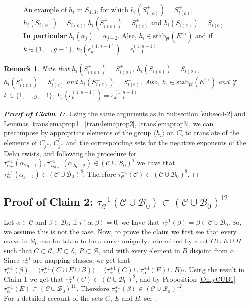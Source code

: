 \documentclass[twoside,11pt,a4paper]{article}
\newtheorem{Rem}[Def]{Remark}
\newcommand*{\stab}[1]{\mathrm{stab}_{pt}(#1)}
\newcommand*{\Cf}{\mathscr{C}}
\newcommand*{\Bf}{\mathscr{B}}
\newcommand*{\Ef}{\mathscr{E}}
\newcommand*{\epsp}[3]{\epsilon_{#1}^{(#2,#3)}}
\begin{document}
\begin{figure}
 \begin{center}
  \resizebox{10cm}{!}{}
 \end{center}\caption{An example of $h_{i}$ in $S_{4,3}$, for which $h_{i}(S_{i(o)}^{+}) = S_{i(o)}^{+}$, $h_{i}(S_{i(o)}^{-}) = S_{i(o)}^{-}$, $h_{i}(S_{i(e)}^{+}) = S_{i(e)}^{+}$ and $h_{i}(S_{i(e)}^{-}) = S_{i(e)}^{-}$. \textbf{In particular} $h_{i}(\alpha_{j}) = \alpha_{j+2}$. Also, $h_{i} \in \stab{E^{i,i}}$ and if $k \in \{1, \ldots, g-1\}$, $h_{i}(\epsp{k}{1}{n-1}) = \epsp{k+1}{1}{n-1}$.}\label{SpheresWithHandlesFig}
\end{figure}
\begin{Rem}
 Note that $h_{i}(S_{i(o)}^{+}) = S_{i(o)}^{+}$, $h_{i}(S_{i(o)}^{-}) = S_{i(o)}^{-}$, $h_{i}(S_{i(e)}^{+}) = S_{i(e)}^{+}$ and $h_{i}(S_{i(e)}^{-}) = S_{i(e)}^{-}$. Also, $h_{i} \in \stab{E^{i,i}}$ and if $k \in \{1, \ldots, g-1\}$, $h_{i}(\epsp{k}{1}{n-1}) = \epsp{k+1}{1}{n-1}$.
\end{Rem}
\begin{proof}[\textbf{Proof of Claim 1:}] Using the same arguments as in Subsection \ref{subsec4-2} and Lemmas \ref{translemaprop1}, \ref{translemaprop2}, \ref{translemaprop3}, we can precompose by appropriate elements of the group $\langle h_{i} \rangle$ on $C_{i}$ to translate of the elements of $C_{j^{+}}$, $C_{j^{+}}^{\prime}$ and the corresponding sets for the negative exponents of the Dehn twists, and following the procedure for $\tau_{\alpha_{2g}}^{\pm 1}(\alpha_{2g-1}), \tau_{\alpha_{2g-1}}^{\pm 1}(\alpha_{2g-2}) \in (\Cf \cup \Bf_{0})^{8}$ we have that $\tau_{\alpha_{j}}^{\pm 1}(\alpha_{j-1}) \in (\Cf \cup \Bf_{0})^{8}$. Therefore $\tau_{\Cf}^{\pm 1}(\Cf) \subset (\Cf \cup \Bf_{0})^{8}$.
\end{proof}
\subsection{Proof of Claim 2: $\tau_{\Cf}^{\pm 1}(\Cf \cup \Bf_{0}) \subset (\Cf \cup \Bf_{0})^{12}$}\label{chap2sec5}
\indent Let $\alpha \in \Cf$ and $\beta \in \Bf_{0}$; if $i(\alpha,\beta) = 0$, we have that $\tau_{\alpha}^{\pm 1}(\beta) = \beta \in \Cf \cup \Bf_{0}$. So, we assume this is not the case. Now, to prove the claim we first see that every curve in $\Bf_{0}$ can be taken to be a curve uniquely determined by a set $C \cup E \cup B$ such that $C \subset \Cf$, $E \subset \Ef$, $B \subset \Bf$, and with every element in $B$ disjoint from $\alpha$.
Since $\tau_{\alpha}^{\pm 1}$ are mapping classes, we get that $\tau_{\alpha}^{\pm 1}(\beta) = \langle \tau_{\alpha}^{\pm 1}(C \cup E \cup B) \rangle = \langle \tau_{\alpha}^{\pm 1}(C) \cup \tau_{\alpha}^{\pm 1}(E) \cup B) \rangle$. Using the result in Claim 1 we get that $\tau_{\alpha}^{\pm 1}(C) \subset (\Cf \cup \Bf_{0})^{8}$, and by Proposition \ref{OnlyCUB0} $\tau_{\alpha}^{\pm 1}(E) \subset (\Cf \cup \Bf_{0})^{11}$. Therefore $\tau_{\alpha}^{\pm 1}(\beta) \in (\Cf \cup \Bf_{0})^{12}$.\\
\indent For a detailed account of the sets $C$, $E$ and $B$, see \cite{Thesis}.\\
\end{document}
